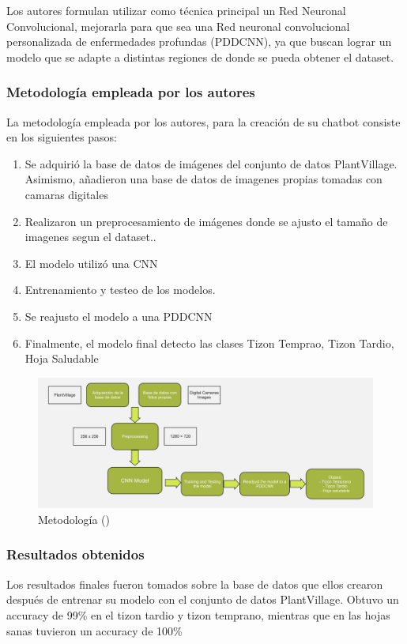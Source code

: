 Los autores formulan utilizar como técnica principal un Red Neuronal Convolucional, mejorarla para que sea una Red neuronal convolucional personalizada de enfermedades profundas (PDDCNN), ya que buscan lograr un modelo que se adapte a distintas regiones de donde se pueda obtener el dataset.


\subsubsection{Metodología empleada por los autores}
La metodología empleada por los autores, para la creación de su chatbot consiste en los siguientes pasos: 
\begin{enumerate}
	\item Se adquirió la base de datos de imágenes del conjunto de datos PlantVillage. Asimismo, añadieron una base de datos de imagenes propias tomadas con camaras digitales
	\item Realizaron un preprocesamiento de imágenes donde se ajusto el tamaño de imagenes segun el dataset..
	\item El modelo utilizó una CNN
	\item Entrenamiento y testeo de los modelos.
	\item Se reajusto el modelo a una PDDCNN
	\item Finalmente, el modelo final detecto las clases Tizon Temprao, Tizon Tardio, Hoja Saludable
\end{enumerate}
\begin{figure}[H]
	\begin{center}
		\includegraphics[width=1\textwidth]{2/figures/ant6.jpg}
		\caption{Metodología (\cite{antecedente6})}
	\end{center}
\end{figure}

\subsubsection{Resultados obtenidos}
Los resultados finales fueron tomados sobre la base de datos que ellos crearon después de entrenar su modelo con el conjunto de datos PlantVillage. Obtuvo un accuracy de 99\% en el tizon tardio y tizon temprano, mientras que en las hojas sanas tuvieron un accuracy de 100\% 

